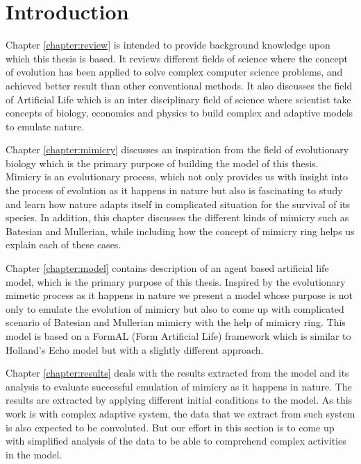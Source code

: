 \chapter{Introduction}
\label{chapter:introduction}


Chapter \ref{chapter:review} is intended to provide background knowledge upon which this thesis is based. It reviews different fields of science where the concept of evolution has been applied to solve complex computer science problems, and achieved better result than other conventional methods. It also discusses the field of Artificial Life which is an inter disciplinary field of science where scientist take concepts of biology, economics and physics to build complex and adaptive models to emulate nature. 

Chapter \ref{chapter:mimicry} discusses an inspiration from the field of evolutionary biology which is the primary purpose of building the model of this thesis. Mimicry is an evolutionary process, which not only provides us with insight into the process of evolution as it happens in nature but also is fascinating to study and learn how nature adapts itself in complicated situation for the survival of its species. In addition, this chapter discusses the different kinds of mimicry such as Batesian and Mullerian, while including how the concept of mimicry ring helps us explain each of these cases. 

Chapter \ref{chapter:model} contains description of an agent based artificial life model, which is the primary purpose of this thesis. Inspired by the evolutionary mimetic process as it happens in nature we present a model whose purpose is not only to emulate the evolution of mimicry but also to come up with complicated scenario of Batesian and Mullerian mimicry with the help of mimicry ring. This model is based on a FormAL (Form Artificial Life) framework which is similar to Holland's Echo model but with a slightly different approach. 

Chapter \ref{chapter:results} deals with the results extracted from the model and its analysis to evaluate successful emulation of mimicry as it happens in nature. The results are extracted by applying different initial conditions to the model. As this work is with complex adaptive system, the data that we extract from such system is also expected to be convoluted. But our effort in this section is to come up with simplified analysis of the data to be able to comprehend complex activities in the model. 

